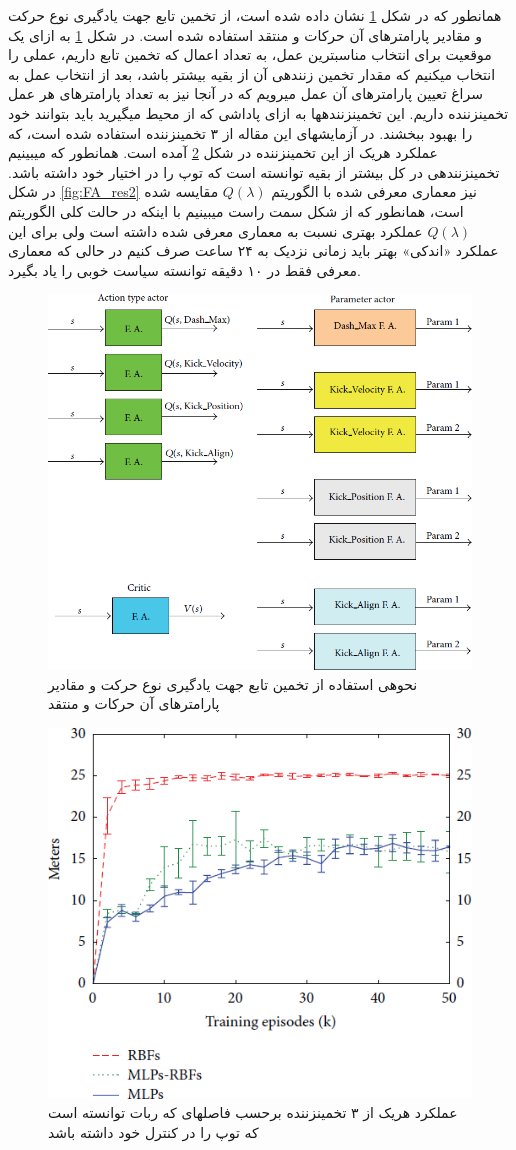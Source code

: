 \documentclass[10pt,a4paper]{article}
\newcommand{\نیمفاصله}{\halfspace}
\renewcommand{\ }{\halfspace}
\newcommand{\مق}{\lr}
\newcommand{\قم}{یادگیری تقویتی }
\newcommand{\ز}{\footnote{\lr{}}}
\begin{document}
همان\ طور که در شکل
\ref{fig:aac}
نشان داده شده است، از تخمین تابع جهت یادگیری نوع حرکت و مقادیر پارامترهای آن حرکات و منتقد استفاده شده است.
در شکل
\ref{fig:aac}
به ازای یک موقعیت برای انتخاب مناسب\ ترین عمل، به تعداد اعمال که تخمین تابع داریم، عملی را انتخاب می\ کنیم که مقدار تخمین زننده\ ی آن از بقیه بیشتر باشد، بعد از انتخاب عمل به سراغ تعیین پارامترهای آن عمل می\ رویم که در آنجا نیز به تعداد پارامترهای هر عمل تخمین\ زننده داریم. این تخمین\ زننده\ ها به ازای پاداشی که از محیط می\ گیرید باید بتوانند خود را بهبود ببخشند. در آزمایش\ های این مقاله از ۳ تخمین\ زننده استفاده شده است، که عملکرد هریک از این تخمین\ زننده در شکل
\ref{fig:FA_res1}
آمده است. همان\ طور که می\ بینیم تخمین\ زننده\ ی \مق{RBF} در کل بیشتر از بقیه توانسته است که توپ را در اختیار خود داشته باشد. در شکل
\ref{fig:FA_res2}
نیز معماری معرفی شده با الگوریتم $Q(\lambda)$ مقایسه شده است، همان\ طور که از شکل سمت راست می\ بینیم با اینکه در حالت کلی الگوریتم $Q(\lambda)$ عملکرد بهتری نسبت به معماری معرفی شده داشته است ولی برای این عملکرد «اندکی» بهتر باید زمانی نزدیک به ۲۴ ساعت صرف کنیم در حالی که معماری معرفی فقط در ۱۰ دقیقه توانسته سیاست خوبی را یاد بگیرد.
\begin{figure}
\centering
\includegraphics[width=.7\textwidth]{aac}
\caption{نحوه\ ی استفاده از تخمین تابع جهت یادگیری نوع حرکت و مقادیر پارامترهای آن حرکات و منتقد}\label{fig:aac}
\end{figure}
\begin{figure}
\centering
\includegraphics[width=.6\textwidth]{res1_1}
\caption{عملکرد هریک از ۳ تخمین\ زننده برحسب فاصله\ ای که ربات توانسته است که توپ را در کنترل خود داشته باشد}\label{fig:FA_res1}
\end{figure}
\end{document}
